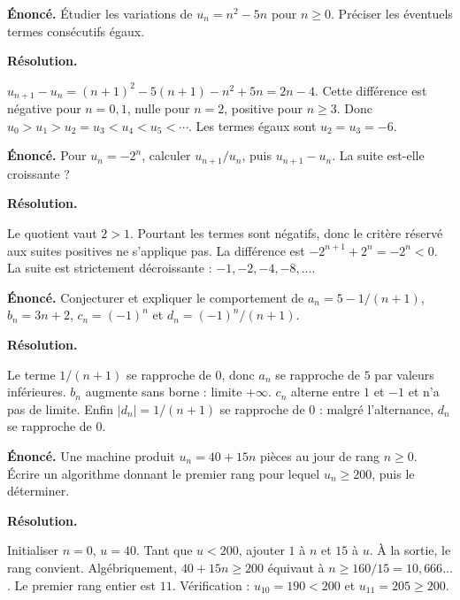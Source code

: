 \documentclass[11pt,a4paper]{article}
\begin{document}
\par\noindent\begin{minipage}{\linewidth}
{\small\color{Muted}\textbf{Énoncé.} Étudier les variations de $u_n=n^2-5n$ pour $n\ge0$. Préciser les éventuels termes consécutifs égaux.}
\par\medskip
\textbf{Résolution.}\par
$u_{n+1}-u_n=(n+1)^2-5(n+1)-n^2+5n=2n-4$. Cette différence est négative pour $n=0,1$, nulle pour $n=2$, positive pour $n\ge3$. Donc $u_0>u_1>u_2=u_3<u_4<u_5<\cdots$. Les termes égaux sont $u_2=u_3=-6$.
\end{minipage}\par
\par\noindent\begin{minipage}{\linewidth}
{\small\color{Muted}\textbf{Énoncé.} Pour $u_n=-2^n$, calculer $u_{n+1}/u_n$, puis $u_{n+1}-u_n$. La suite est-elle croissante ?}
\par\medskip
\textbf{Résolution.}\par
Le quotient vaut $2>1$. Pourtant les termes sont négatifs, donc le critère réservé aux suites positives ne s’applique pas. La différence est $-2^{n+1}+2^n=-2^n<0$. La suite est strictement décroissante : $-1,-2,-4,-8,\ldots$.
\end{minipage}\par
\par\noindent\begin{minipage}{\linewidth}
{\small\color{Muted}\textbf{Énoncé.} Conjecturer et expliquer le comportement de $a_n=5-1/(n+1)$, $b_n=3n+2$, $c_n=(-1)^n$ et $d_n=(-1)^n/(n+1)$.}
\par\medskip
\textbf{Résolution.}\par
Le terme $1/(n+1)$ se rapproche de $0$, donc $a_n$ se rapproche de $5$ par valeurs inférieures. $b_n$ augmente sans borne : limite $+\infty$. $c_n$ alterne entre $1$ et $-1$ et n’a pas de limite. Enfin $|d_n|=1/(n+1)$ se rapproche de $0$ : malgré l’alternance, $d_n$ se rapproche de $0$.
\end{minipage}\par
\par\noindent\begin{minipage}{\linewidth}
{\small\color{Muted}\textbf{Énoncé.} Une machine produit $u_n=40+15n$ pièces au jour de rang $n\ge0$. Écrire un algorithme donnant le premier rang pour lequel $u_n\ge200$, puis le déterminer.}
\par\medskip
\textbf{Résolution.}\par
Initialiser $n=0$, $u=40$. Tant que $u<200$, ajouter $1$ à $n$ et $15$ à $u$. À la sortie, le rang convient. Algébriquement, $40+15n\ge200$ équivaut à $n\ge160/15=10,666\ldots$. Le premier rang entier est $11$. Vérification : $u_{10}=190<200$ et $u_{11}=205\ge200$.
\end{minipage}\par
\end{document}
